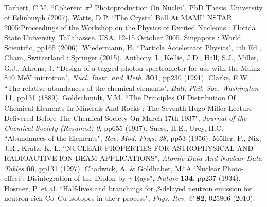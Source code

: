\documentclass[a4paper,12pt]{article}
\begin{document}
\begin{thebibliography}{99}
 Tarbert, C.M. ``Coherent $\pi^{0}$ Photoproduction On Nuclei", PhD Thesis, University of Edinburgh (2007).
 Watts, D.P. ``The Crystal Ball At MAMI" NSTAR 2005:Proceedings of the Workshop on the Physics of Excited Nucleons : Florida State University, Tallahassee, USA, 12-15 October 2005, Singapore : World Scientific, pp165 (2006).
 Wiedermann, H. ``Particle Accelerator Physics", 4th Ed., Cham, Switzerland : Springer (2015).
 Anthony, I., Kellie, J.D., Hall, S.J., Miller, G.J., Ahrens, J. ``Design of a tagged photon spectrometer for use with the Mainz 840 MeV microtron", \textit{Nucl. Instr. and Meth.} \textbf{301}, pp230 (1991).
 Clarke, F.W. ``The relative abundances of the chemical elements", \textit{Bull. Phil. Soc. Washington} \textbf{11}, pp131 (1889).
 Goldschmidt, V.M. ``The Principles Of Distribution Of Chemical Elements In Minerals And Rocks : The Seventh Hugo Miller Lecture Delivered Before The Chemical Society On March 17th 1937", \textit{Journal of the Chemical Society (Resumed)} \textit{0}, pp655 (1937).
 Suess, H.E., Urey, H.C. ``Abundances of the Elements", \textit{Rev. Mod. Phys.} \textit{28}, pp53 (1956).
 M\"oller, P., Nix, J.R., Kratz, K.-L. ``NUCLEAR PROPERTIES FOR ASTROPHYSICAL AND RADIOACTIVE-ION-BEAM APPLICATIONS", \textit{Atomic Data And Nuclear Data Tables} \textbf{66}, pp131 (1997).
 Chadwick, A. \& Goldhaber, M.``A `Nuclear Photo-effect': Disintegration of the Diplon by $\gamma$-Rays", \textit{Nature} \textbf{134}, pp237 (1934).
 Hosmer, P. et al. ``Half-lives and branchings for $\beta$-delayed neutron emission for neutron-rich Co–Cu isotopes in the r-process", \textit{Phys. Rev. C} \textbf{82}, 025806 (2010).

\end{thebibliography}
\end{document}
